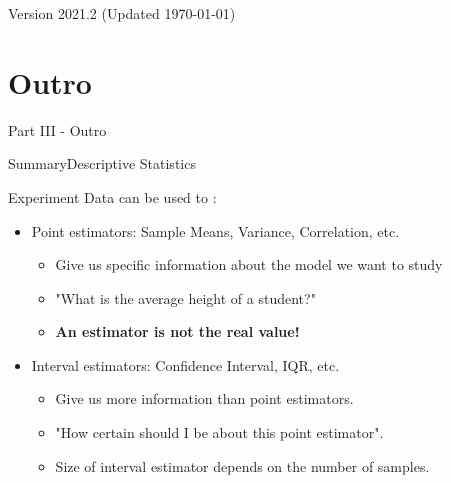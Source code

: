 \documentclass[aspectratio=169]{beamer}
\subtitle[Statistical Indicators]{Topic 02 - Point and Interval Indicators}
\begin{document}
\begin{CJK}{UTF8}{ipxm}

\begin{frame}
  \maketitle

  \vfill

  \hfill \tiny{Version 2021.2 (Updated \today)}
\end{frame}



\section{Outro}
\begin{frame}
  \begin{center}
    Part III - Outro
  \end{center}
\end{frame}

\begin{frame}{Summary}{Descriptive Statistics}

  Experiment Data can be used to :
  \bigskip

  \begin{itemize}
    \item Point estimators: Sample Means, Variance, Correlation, etc.
    \begin{itemize}
      \item Give us specific information about the model we want to study
      \item "What is the average height of a student?"
      \item {\bf An estimator is not the real value!}
    \end{itemize}\bigskip

    \item Interval estimators: Confidence Interval, IQR, etc.
    \begin{itemize}
      \item Give us more information than point estimators.
      \item "How certain should I be about this point estimator".
      \item Size of interval estimator depends on the number of samples.
    \end{itemize}
  \end{itemize}
\end{frame}



\end{CJK}
\end{document}
